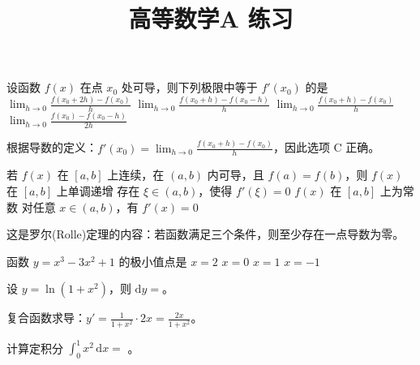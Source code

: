 \documentclass[answer]{THUExam}
\title{高等数学A 练习}
\author{}
\begin{document}
\vspace{1cm}
\makehead

\vspace{1cm}


\begin{problem}
设函数 $f(x)$ 在点 $x_0$ 处可导，则下列极限中等于 $f'(x_0)$ 的是
\options
{$\displaystyle\lim_{h\to 0}\frac{f(x_0+2h)-f(x_0)}{h}$}
{$\displaystyle\lim_{h\to 0}\frac{f(x_0+h)-f(x_0-h)}{h}$}
{$\displaystyle\lim_{h\to 0}\frac{f(x_0+h)-f(x_0)}{h}$}
{$\displaystyle\lim_{h\to 0}\frac{f(x_0)-f(x_0-h)}{2h}$}
\end{problem}
\begin{note}
根据导数的定义：$f'(x_0)=\displaystyle\lim_{h\to 0}\frac{f(x_0+h)-f(x_0)}{h}$，因此选项 C 正确。
\end{note}
\bigskip

\begin{problem}
若 $f(x)$ 在 $[a,b]$ 上连续，在 $(a,b)$ 内可导，且 $f(a)=f(b)$，则
\options
{$f(x)$ 在 $[a,b]$ 上单调递增}
{存在 $\xi\in(a,b)$，使得 $f'(\xi)=0$}
{$f(x)$ 在 $[a,b]$ 上为常数}
{对任意 $x\in(a,b)$，有 $f'(x)=0$}
\end{problem}
\begin{note}
这是罗尔(Rolle)定理的内容：若函数满足三个条件，则至少存在一点导数为零。
\end{note}
\bigskip

\begin{problem}
函数 $y=x^3-3x^2+1$ 的极小值点是
\options
{$x=2$}
{$x=0$}
{$x=1$}
{$x=-1$}
\end{problem}
\bigskip


\begin{problem}
设 $y=\ln(1+x^2)$，则 $\mathrm{d}y=$。
\end{problem}
\begin{note}
复合函数求导：$y'=\frac{1}{1+x^2}\cdot 2x = \frac{2x}{1+x^2}$。
\end{note}
\bigskip

\begin{problem}
计算定积分 $\displaystyle\int_0^1 x^2\,\mathrm{d}x = $ 。
\end{problem}
\bigskip
\end{document}
